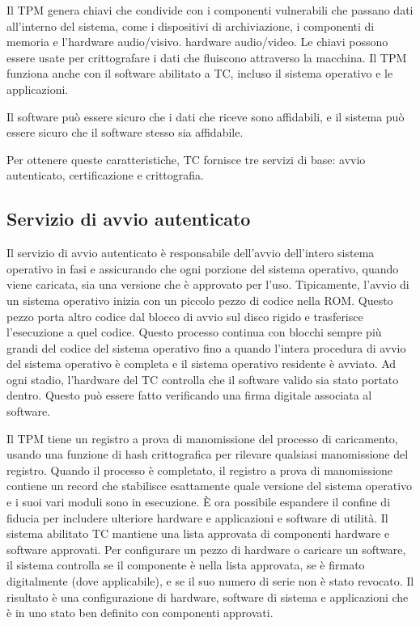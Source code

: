 \singlespacing

Il TPM genera chiavi che condivide con i componenti vulnerabili che passano dati all'interno del sistema, come i dispositivi di archiviazione, i componenti di memoria e l'hardware audio/visivo. hardware audio/video. Le chiavi possono essere usate per crittografare i dati che fluiscono attraverso la macchina. Il TPM funziona anche con il software abilitato a TC, incluso il sistema operativo e le applicazioni.

\singlespacing

Il software può essere sicuro che i dati che riceve sono affidabili, e il sistema può essere sicuro che il software stesso sia affidabile.

\singlespacing

Per ottenere queste caratteristiche, TC fornisce tre servizi di base: avvio autenticato, certificazione e crittografia.

\newpage
\subsection{Servizio di avvio autenticato}

Il servizio di avvio autenticato è responsabile dell'avvio dell'intero sistema operativo in fasi e assicurando che ogni porzione del sistema operativo, quando viene caricata, sia una versione che è approvato per l'uso. Tipicamente, l'avvio di un sistema operativo inizia con un piccolo pezzo di codice nella ROM. Questo pezzo porta altro codice dal blocco di avvio sul disco rigido e trasferisce l'esecuzione a quel codice. Questo processo continua con blocchi sempre più grandi del codice del sistema operativo fino a quando l'intera procedura di avvio del sistema operativo è completa e il sistema operativo residente è avviato. Ad ogni stadio, l'hardware del TC controlla che il software valido sia stato portato dentro. Questo può essere fatto verificando una firma digitale associata al software.

\singlespacing

Il TPM tiene un registro a prova di manomissione del processo di caricamento, usando una funzione di hash crittografica per rilevare qualsiasi manomissione del registro. Quando il processo è completato, il registro a prova di manomissione contiene un record che stabilisce esattamente quale versione del sistema operativo e i suoi vari moduli sono in esecuzione. È ora possibile espandere il confine di fiducia per includere ulteriore hardware e applicazioni e software di utilità. Il sistema abilitato TC mantiene una lista approvata di componenti hardware e software approvati. Per configurare un pezzo di hardware o caricare un software, il sistema controlla se il componente è nella lista approvata, se è firmato digitalmente (dove applicabile), e se il suo numero di serie non è stato revocato. Il risultato è una configurazione di hardware, software di sistema e applicazioni che è in uno stato ben definito con componenti approvati.

